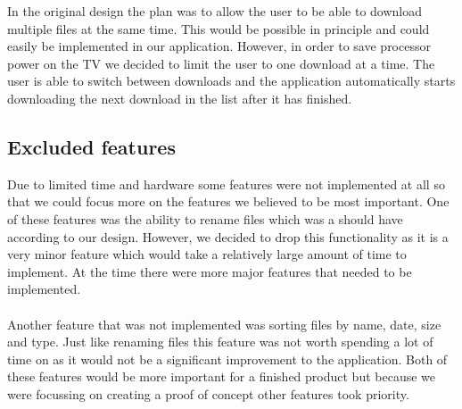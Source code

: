 In the original design the plan was to allow the user to be able to download multiple files at the same time. This would be possible in principle and could easily be implemented in our application. However, in order to save processor power on the TV we decided to limit the user to one download at a time. The user is able to switch between downloads and the application automatically starts downloading the next download in the list after it has finished.

\subsection{Excluded features}

Due to limited time and hardware some features were not implemented at all so that we could focus more on the features we believed to be most important. One of these features was the ability to rename files which was a should have according to our design. However, we decided to drop this functionality as it is a very minor feature which would take a relatively large amount of time to implement. At the time there were more major features that needed to be implemented.
\\\\
Another feature that was not implemented was sorting files by name, date, size and type. Just like renaming files this feature was not worth spending a lot of time on as it would not be a significant improvement to the application. Both of these features would be more important for a finished product but because we were focussing on creating a proof of concept other features took priority.

